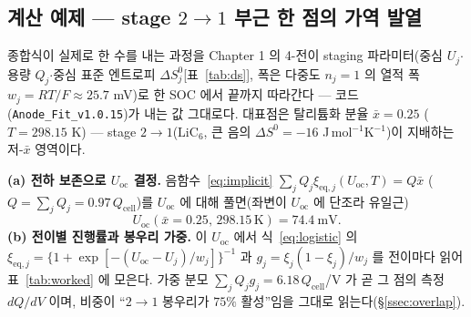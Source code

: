 \documentclass[11pt,a4paper]{article}
\newcommand{\eq}{\mathrm{eq}}
\newcommand{\oc}{\mathrm{oc}}
\newcommand{\cell}{\mathrm{cell}}
\begin{document}
\subsection{계산 예제 — stage $2\!\to\!1$ 부근 한 점의 가역 발열}\label{ssec:worked}
종합식이 실제로 한 수를 내는 과정을 Chapter 1 의 4-전이 staging 파라미터(중심 $U_j$$\cdot$용량 $Q_j$$\cdot$중심 표준
엔트로피 $\Delta S^0_j$[표~\ref{tab:ds}], 폭은 다중도 $n_j{=}1$ 의 열적 폭 $w_j{=}RT/F\!\approx\!25.7$ mV)로 한 SOC 에서
끝까지 따라간다 --- 코드(\texttt{Anode\_Fit\_v1.0.15})가 내는 값 그대로다. 대표점은 탈리튬화 분율 $\bar x=0.25$
($T=298.15$ K) --- stage $2\!\to\!1$($\mathrm{LiC_6}$, 큰 음의 $\Delta S^0=-16$ J\,mol$^{-1}$K$^{-1}$)이 지배하는 저-$\bar x$ 영역이다.

\textbf{(a) 전하 보존으로 $U_\oc$ 결정.} 음함수~\eqref{eq:implicit} $\sum_jQ_j\xi_{\eq,j}(U_\oc,T)=Q\bar x$
($Q=\sum_jQ_j=0.97\,Q_\cell$)를 $U_\oc$ 에 대해 풀면(좌변이 $U_\oc$ 에 단조라 유일근)
\begin{equation*}
U_\oc(\bar x{=}0.25,\,298.15\,\mathrm K)=74.4\ \mathrm{mV}.
\end{equation*}
\textbf{(b) 전이별 진행률과 봉우리 가중.} 이 $U_\oc$ 에서 식~\eqref{eq:logistic} 의
$\xi_{\eq,j}=\{1{+}\exp[-(U_\oc-U_j)/w_j]\}^{-1}$ 과 $g_j=\xi_j(1-\xi_j)/w_j$ 를 전이마다 읽어 표~\ref{tab:worked} 에
모은다. 가중 분모 $\sum_jQ_jg_j=6.18\,Q_\cell$/V 가 곧 그 점의 측정 $dQ/dV$ 이며, 비중이 ``$2\!\to\!1$ 봉우리가
$75\%$ 활성''임을 그대로 읽는다(\S\ref{ssec:overlap}).
\end{document}
